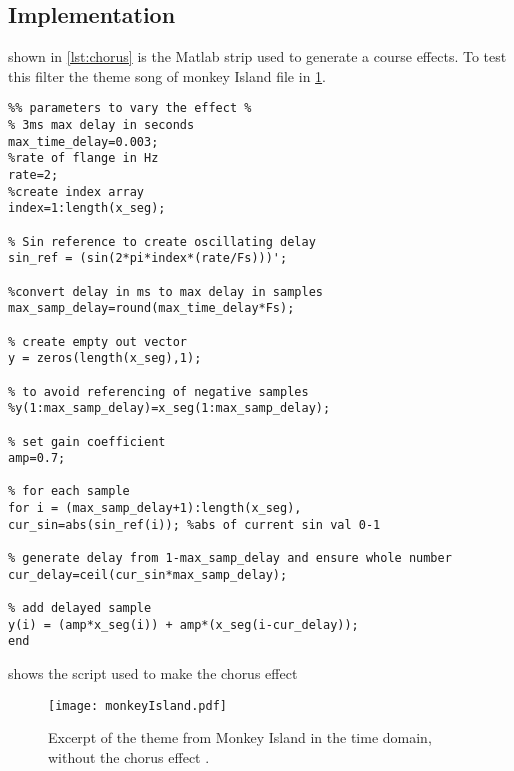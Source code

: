 
\subsection{Implementation}
shown in \ref{lst:chorus} is the Matlab strip used to generate a course effects.
To test this filter the theme song of monkey Island file in \ref{fig:monkeyIsland}.


\begin{listing}
	\begin{verbatim}
%% parameters to vary the effect %
% 3ms max delay in seconds
max_time_delay=0.003;
%rate of flange in Hz
rate=2;                         
%create index array
index=1:length(x_seg);

% Sin reference to create oscillating delay
sin_ref = (sin(2*pi*index*(rate/Fs)))';

%convert delay in ms to max delay in samples
max_samp_delay=round(max_time_delay*Fs);

% create empty out vector
y = zeros(length(x_seg),1);

% to avoid referencing of negative samples
%y(1:max_samp_delay)=x_seg(1:max_samp_delay);

% set gain coefficient
amp=0.7;

% for each sample
for i = (max_samp_delay+1):length(x_seg),
cur_sin=abs(sin_ref(i)); %abs of current sin val 0-1

% generate delay from 1-max_samp_delay and ensure whole number
cur_delay=ceil(cur_sin*max_samp_delay);

% add delayed sample
y(i) = (amp*x_seg(i)) + amp*(x_seg(i-cur_delay));
end
	\end{verbatim}
	\caption{shows the script used to make the chorus effect}
	\label{lst:chorus}
\end{listing}

\begin{figure}[!hbt]
	\centering
	\texttt{[image: monkeyIsland.pdf]}
	\caption{Excerpt of the theme from Monkey Island in the time domain, without the chorus effect .}
	\label{fig:monkeyIsland}
\end{figure}


